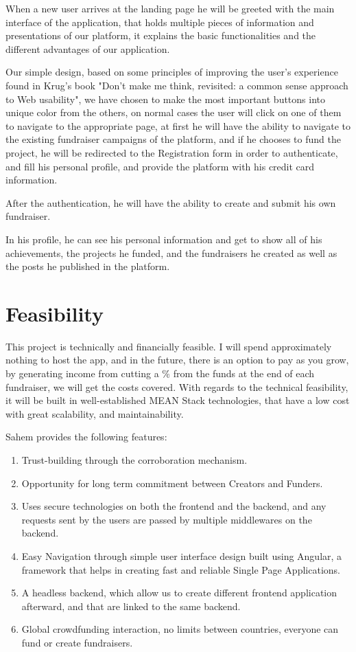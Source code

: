 When a new user arrives at the landing page he will be greeted with the main interface of the application, that holds multiple pieces of information and presentations of our platform, it explains the basic functionalities and the different advantages of our application.

Our simple design, based on some principles of improving the user's experience found in Krug's book "Don't make me think, revisited: a common sense approach to Web usability", we have chosen to make the most important buttons into unique color from the others, on normal cases the user will click on one of them to navigate to the appropriate page, at first he will have the ability to navigate to the existing fundraiser campaigns of the platform, and if he chooses to fund the project, he will be redirected to the Registration form in order to authenticate, and fill his personal profile, and provide the platform with his credit card information.

After the authentication, he will have the ability to create and submit his own fundraiser.

In his profile, he can see his personal information and get to show all of his achievements, the projects he funded, and the fundraisers he created as well as the posts he published in the platform. 

\section{Feasibility}
This project is technically and financially feasible. I will spend approximately nothing to host the app, and in the future, there is an option to pay as you grow, by generating income from cutting a \% from the funds at the end of each fundraiser, we will get the costs covered. With regards to the technical feasibility, it will be built in well-established MEAN Stack technologies, that have a low cost with great scalability, and maintainability.

Sahem provides the following features:
\begin{enumerate}
      \item Trust-building through the corroboration mechanism.
      \item
            Opportunity for long term commitment between Creators and Funders.
      \item
            Uses secure technologies on both the frontend and the backend, and any requests sent by the users are passed by multiple middlewares on the backend.
      \item
            Easy Navigation through simple user interface design built using Angular, a framework that helps in creating fast and reliable Single Page Applications.
      \item
            A headless backend, which allow us to create different frontend application afterward, and that are linked to the same backend.
      \item
            Global crowdfunding interaction, no limits between countries, everyone can fund or create fundraisers.
\end{enumerate}
